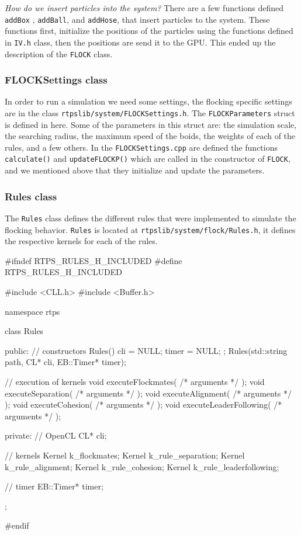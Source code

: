 \textit{How do we insert particles into the system?} There are a few functions defined \texttt{addBox} , \texttt{addBall}, and \texttt{addHose}, that insert particles to the system. These functions first, initialize the positions of the particles using the functions defined in \texttt{IV.h} class, then the positions are send it to the GPU. This ended up the description of the \texttt{FLOCK} class.
 
\subsubsection{FLOCKSettings class}
In order to run a simulation we need some settings, the flocking specific settings are in the class \texttt{rtpslib/system/FLOCKSettings.h}. The \texttt{FLOCKParameters} struct is defined in here. Some of the parameters in this struct are: the simulation scale, the searching radius, the maximum speed of the boids, the weights of each of the rules, and a few others. In the \texttt{FLOCKSettings.cpp} are defined the functions \texttt{calculate()} and \texttt{updateFLOCKP()} which are called in the constructor of \texttt{FLOCK}, and we mentioned above that they initialize and update the parameters.

\subsubsection{Rules class}
The \texttt{Rules} class defines the different rules that were implemented to simulate the flocking behavior. \texttt{Rules} is located at \texttt{rtpslib/system/flock/Rules.h}, it defines the respective kernels for each of the rules.

\begin{cppcode}{0}
#ifndef RTPS_RULES_H_INCLUDED
#define RTPS_RULES_H_INCLUDED

#include <CLL.h>
 #include <Buffer.h>

namespace rtps
 {
	class Rules
	{
		public:
			// constructors
			Rules() { cli = NULL; timer = NULL; };
			Rules(std::string path, CL* cli, EB::Timer* timer);
			
			// execution of kernels
			void executeFlockmates( /* arguments */ );
			void executeSeparation( /* arguments */ );
			void executeAlignment( /* arguments */ );
			void executeCohesion( /* arguments */ );
			void executeLeaderFollowing( /* arguments */ );
			
		private:
			// OpenCL
			CL* cli;
			
			// kernels
			Kernel k_flockmates;
			Kernel k_rule_separation;
			Kernel k_rule_alignment;
			Kernel k_rule_cohesion;
			Kernel k_rule_leaderfollowing;
			
			// timer
			EB::Timer* timer;
	};
}
#endif
\end{cppcode}

